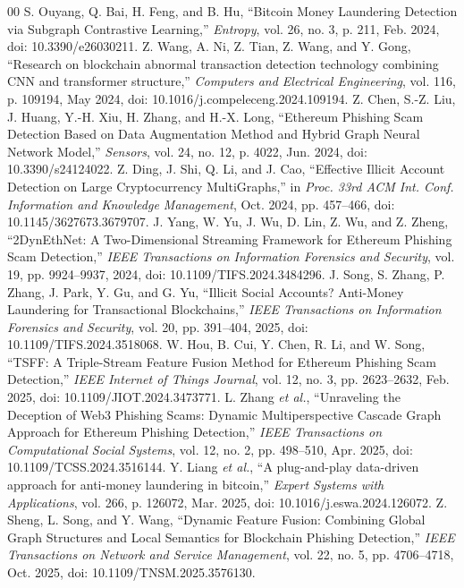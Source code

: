 \documentclass{ieeeaccess}
\begin{document}
\begin{thebibliography}{00}
 S. Ouyang, Q. Bai, H. Feng, and B. Hu, ``Bitcoin Money Laundering Detection via Subgraph Contrastive Learning,'' \emph{Entropy}, vol. 26, no. 3, p. 211, Feb. 2024, doi: 10.3390/e26030211.
 Z. Wang, A. Ni, Z. Tian, Z. Wang, and Y. Gong, ``Research on blockchain abnormal transaction detection technology combining CNN and transformer structure,'' \emph{Computers and Electrical Engineering}, vol. 116, p. 109194, May 2024, doi: 10.1016/j.compeleceng.2024.109194.
 Z. Chen, S.-Z. Liu, J. Huang, Y.-H. Xiu, H. Zhang, and H.-X. Long, ``Ethereum Phishing Scam Detection Based on Data Augmentation Method and Hybrid Graph Neural Network Model,'' \emph{Sensors}, vol. 24, no. 12, p. 4022, Jun. 2024, doi: 10.3390/s24124022.
 Z. Ding, J. Shi, Q. Li, and J. Cao, ``Effective Illicit Account Detection on Large Cryptocurrency MultiGraphs,'' in \emph{Proc. 33rd ACM Int. Conf. Information and Knowledge Management}, Oct. 2024, pp. 457--466, doi: 10.1145/3627673.3679707.
 J. Yang, W. Yu, J. Wu, D. Lin, Z. Wu, and Z. Zheng, ``2DynEthNet: A Two-Dimensional Streaming Framework for Ethereum Phishing Scam Detection,'' \emph{IEEE Transactions on Information Forensics and Security}, vol. 19, pp. 9924--9937, 2024, doi: 10.1109/TIFS.2024.3484296.
 J. Song, S. Zhang, P. Zhang, J. Park, Y. Gu, and G. Yu, ``Illicit Social Accounts? Anti-Money Laundering for Transactional Blockchains,'' \emph{IEEE Transactions on Information Forensics and Security}, vol. 20, pp. 391--404, 2025, doi: 10.1109/TIFS.2024.3518068.
 W. Hou, B. Cui, Y. Chen, R. Li, and W. Song, ``TSFF: A Triple-Stream Feature Fusion Method for Ethereum Phishing Scam Detection,'' \emph{IEEE Internet of Things Journal}, vol. 12, no. 3, pp. 2623--2632, Feb. 2025, doi: 10.1109/JIOT.2024.3473771.
 L. Zhang \emph{et al.}, ``Unraveling the Deception of Web3 Phishing Scams: Dynamic Multiperspective Cascade Graph Approach for Ethereum Phishing Detection,'' \emph{IEEE Transactions on Computational Social Systems}, vol. 12, no. 2, pp. 498--510, Apr. 2025, doi: 10.1109/TCSS.2024.3516144.
 Y. Liang \emph{et al.}, ``A plug-and-play data-driven approach for anti-money laundering in bitcoin,'' \emph{Expert Systems with Applications}, vol. 266, p. 126072, Mar. 2025, doi: 10.1016/j.eswa.2024.126072.
 Z. Sheng, L. Song, and Y. Wang, ``Dynamic Feature Fusion: Combining Global Graph Structures and Local Semantics for Blockchain Phishing Detection,'' \emph{IEEE Transactions on Network and Service Management}, vol. 22, no. 5, pp. 4706--4718, Oct. 2025, doi: 10.1109/TNSM.2025.3576130.

\end{thebibliography}
\end{document}
